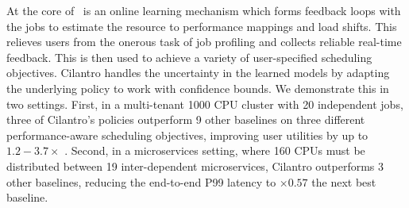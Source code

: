 At the core of \cilantro~is an online learning mechanism which forms feedback loops with the jobs
to estimate the resource to performance mappings and load shifts.
This relieves users from the onerous task of job profiling
and collects reliable real-time feedback.
This is then used to achieve a variety of
user-specified scheduling objectives.
Cilantro handles the uncertainty in the learned models by adapting the
underlying policy to work with confidence bounds. 
We demonstrate this in two settings.
First, in a
multi-tenant 1000 CPU cluster with 20 independent jobs,
three of Cilantro's policies outperform 9 other baselines on
three different performance-aware scheduling objectives,
improving user utilities by up to $1.2-3.7\times$ .
Second, in a microservices setting, where 160 CPUs must be distributed between 19
inter-dependent microservices, Cilantro outperforms 3 other baselines,
reducing the end-to-end P99 latency to  $\times 0.57$ the next best baseline.
% 

